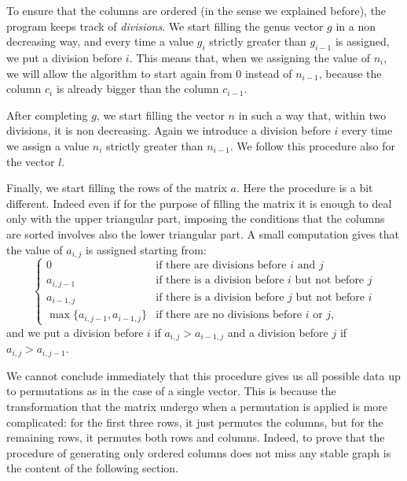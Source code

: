 \documentclass{amsart}
\theoremstyle{plain}
\theoremstyle{definition}
\begin{document}
To ensure that the columns are ordered (in the sense we explained
before), the program keeps track of \emph{divisions}. We start filling
the genus vector $g$ in a non decreasing way, and every time a value
$g_i$ strictly greater than $g_{i-1}$ is assigned, we put a division
before $i$.
This means that, when we assigning the value of $n_i$, we will allow
the algorithm to start again from $0$ instead of $n_{i-1}$, because the column 
$c_i$ is already bigger than the column $c_{i-1}$.

After completing $g$, we start filling the vector $n$ in such a way
that, within two divisions, it is non decreasing. Again we introduce a
division before $i$ every time we assign a value $n_i$ strictly
greater than $n_{i-1}$. We follow this procedure also for the vector
$l$.

Finally, we start filling the rows of the matrix $a$. Here the
procedure is a bit different. Indeed even if for the purpose of filling 
the matrix it is enough to deal only with the upper triangular part, 
imposing the conditions that the columns are sorted involves also the 
lower triangular part. A small computation gives that the value of 
$a_{i,j}$ is assigned starting from:
\[
\begin{cases}
  0 & \text{if there are divisions before $i$ and $j$}\\
  a_{i,j-1} & \text{if there is a division before $i$ but not before
    $j$}\\
  a_{i-1,j} & \text{if there is a division before $j$ but not before
    $i$}\\
  \max\{a_{i,j-1}, a_{i-1,j}\} & \text{if there are no divisions
    before $i$ or $j$,}
\end{cases}
\]
and we put a division before $i$ if $a_{i,j} > a_{i-1,j}$ and a division
before $j$ if $a_{i,j} > a_{i,j-1}$.

We cannot conclude immediately that this procedure gives us all
possible data up to permutations as in the case of a single
vector. This is because the transformation that the matrix undergo
when a permutation is applied is more complicated: for the first three
rows, it just permutes the columns, but for the remaining rows, it
permutes both rows and columns. Indeed, to prove that the procedure of
generating only ordered columns does not miss any stable graph is the
content of the following section.
\end{document}
